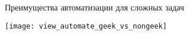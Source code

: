 \begin{frame}{Преимущества автоматизации для сложных задач}
    \begin{center}
      \texttt{[image: view\_automate\_geek\_vs\_nongeek]}
    \end{center}
\end{frame}

